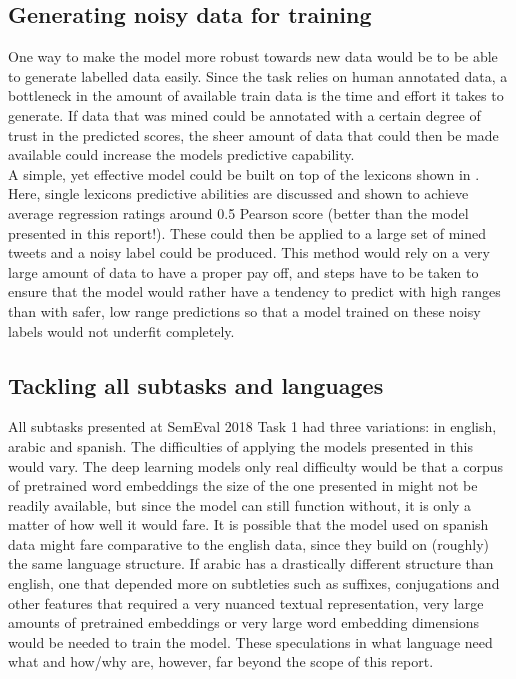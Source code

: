 \subsection{Generating noisy data for training}
One way to make the model more robust towards new data would be to be able to generate labelled data easily. Since the task relies on human annotated data, a bottleneck in the amount of available train data is the time and effort it takes to generate. If data that was mined could be annotated with a certain degree of trust in the predicted scores, the sheer amount of data that could then be made available could increase the models predictive capability.\\
A simple, yet effective model could be built on top of the lexicons shown in \cite{wassa2017}. Here, single lexicons predictive abilities are discussed and shown to achieve average regression ratings around 0.5 Pearson score (better than the model presented in this report!). These could then be applied to a large set of mined tweets and a noisy label could be produced. This method would rely on a very large amount of data to have a proper pay off, and steps have to be taken to ensure that the model would rather have a tendency to predict with high ranges than with safer, low range predictions so that a model trained on these noisy labels would not underfit completely.

\subsection{Tackling all subtasks and languages}
All subtasks presented at SemEval 2018 Task 1 had three variations: in english, arabic and spanish. The difficulties of applying the models presented in this would vary. The deep learning models only real difficulty would be that a corpus of pretrained word embeddings the size of the one presented in \cite{godin} might not be readily available, but since the model can still function without, it is only a matter of how well it would fare. It is possible that the model used on spanish data might fare comparative to the english data, since they build on (roughly) the same language structure. If arabic has a drastically different structure than english, one that depended more on subtleties such as suffixes, conjugations and other features that required a very nuanced textual representation, very large amounts of pretrained embeddings or very large word embedding dimensions would be needed to train the model. These speculations in what language need what and how/why are, however, far beyond the scope of this report.
